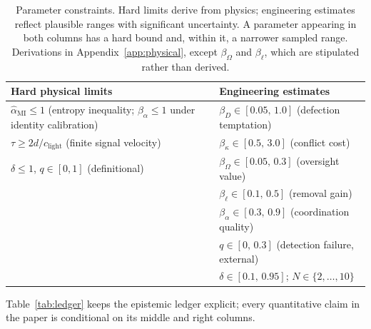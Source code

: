 \documentclass[manuscript,screen,review]{jair}
\begin{document}
\begin{table}
\caption{Parameter constraints. Hard limits derive from physics; engineering estimates reflect plausible ranges with significant uncertainty. A parameter appearing in both columns has a hard bound and, within it, a narrower sampled range. Derivations in Appendix~\ref{app:physical}, except $\beta_\Omega$ and $\beta_\ell$, which are stipulated rather than derived.}
\label{tab:bounds}
\centering
\begin{tabular}{ll}
\toprule
\textbf{Hard physical limits} & \textbf{Engineering estimates} \\
\midrule
$\hat\alpha_{\mathrm{MI}} \leq 1$ (entropy inequality; $\beta_\alpha \leq 1$ under identity calibration) & $\beta_D \in [0.05,\,1.0]$ (defection temptation) \\
$\tau \geq 2d/c_{\mathrm{light}}$ (finite signal velocity) & $\beta_\kappa \in [0.5,\,3.0]$ (conflict cost) \\
$\delta \leq 1$, $q \in [0,1]$ (definitional) & $\beta_\Omega \in [0.05,\,0.3]$ (oversight value) \\
 & $\beta_\ell \in [0.1,\,0.5]$ (removal gain) \\
 & $\beta_\alpha \in [0.3,\,0.9]$ (coordination quality) \\
 & $q \in [0,\,0.3]$ (detection failure, external) \\
 & $\delta \in [0.1,\,0.95]$; \; $N \in \{2,\ldots,10\}$ \\
\bottomrule
\end{tabular}
\end{table}

Table~\ref{tab:ledger} keeps the epistemic ledger explicit; every quantitative claim in the paper is conditional on its middle and right columns.
\end{document}
